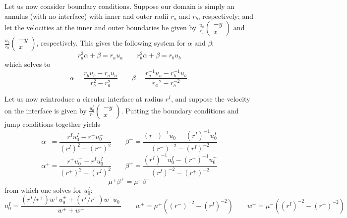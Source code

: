 \documentclass{article}
\newcommand{\q}{\quad\quad}
\newcommand{\mx}[1]{\begin{pmatrix} #1 \end{pmatrix}}
\begin{document}
Let us now consider boundary conditions.  Suppose our domain is simply an annulus (with no interface) with inner and outer radii $r_a$ and $r_b$, respectively; and let the velocities at the inner and outer boundaries be given by $\frac{u_a}{r_a} \mx{-y \\ x}$ and $\frac{u_b}{r_b} \mx{-y \\ x}$, respectively.  This gives the following system for $\alpha$ and $\beta$:
$$ r_a^2 \alpha + \beta = r_a u_a \q r_b^2 \alpha + \beta = r_b u_b $$
which solves to
$$ \alpha = \frac{r_b u_b - r_a u_a}{r_b^2 - r_a^2} \q \beta = \frac{r_a^{-1} u_a - r_b^{-1} u_b}{r_a^{-2} - r_b^{-2}}. $$

Let us now reintroduce a circular interface at radius $r^I$, and suppose the velocity on the interface is given by $\frac{u^I_0}{r^I} \mx{-y \\ x}$.  Putting the boundary conditions and jump conditions together yields
$$ \alpha^- = \frac{r^I u^I_0 - r^- u^-_0}{(r^I)^2 - (r^-)^2} \q \beta^- = \frac{(r^-)^{-1} u^-_0 - (r^I)^{-1} u^I_0}{(r^-)^{-2} - (r^I)^{-2}} $$
$$ \alpha^+ = \frac{r^+ u^+_0 - r^I u^I_0}{(r^+)^2 - (r^I)^2} \q \beta^+ = \frac{(r^I)^{-1} u^I_0 - (r^+)^{-1} u^+_0}{(r^I)^{-2} - (r^+)^{-2}} $$
$$ \mu^+ \beta^+ = \mu^- \beta^- $$
from which one solves for $u^I_0$:
$$ u^I_0 = \frac{(r^I/r^+) w^+ u^+_0 + (r^I/r^-) w^- u^-_0}{w^+ + w^-} \q w^+ = \mu^+ \left( (r^-)^{-2} - (r^I)^{-2} \right) \q w^- = \mu^- \left( (r^I)^{-2} - (r^+)^{-2} \right) $$
\end{document}

